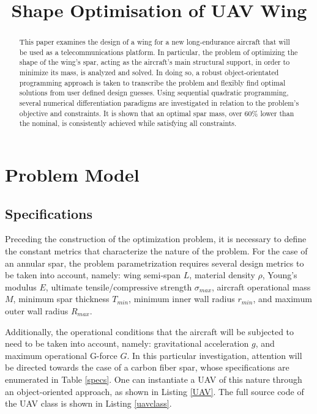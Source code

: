 \documentclass{article}
\title{Shape Optimisation of UAV Wing}
\begin{document}
\maketitle

\begin{abstract}
    This paper examines the design of a wing for a new long-endurance aircraft that will be used as a telecommunications platform. In particular, the problem of optimizing the shape of the wing's spar, acting as the aircraft's main structural support, in order to minimize its mass, is analyzed and solved. In doing so, a robust object-orientated programming approach is taken to transcribe the problem and flexibly find optimal solutions from user defined design guesses. Using sequential quadratic programming, several numerical differentiation paradigms are investigated in relation to the problem's objective and constraints. It is shown that an optimal spar mass, over 60\% lower than the nominal, is consistently achieved while satisfying all constraints.
\end{abstract}
    

\tableofcontents
\listoftables
\listoffigures
\lstlistoflistings

\section{Problem Model}
\subsection{Specifications}
Preceding the construction of the optimization problem, it is necessary to define the constant metrics that characterize the nature of the problem. For the case of an annular spar, the problem parametrization requires several design metrics to be taken into account, namely: wing semi-span $L$, material density $\rho$, Young's modulus $E$, ultimate tensile/compressive strength $\sigma_{max}$, aircraft operational mass $M$, minimum spar thickness $T_{min}$, minimum inner wall radius $r_{min}$, and maximum outer wall radius $R_{max}$. 

Additionally, the operational conditions that the aircraft will be subjected to need to be taken into account, namely: gravitational acceleration $g$, and maximum operational G-force $G$. In this particular investigation, attention will be directed towards the case of a carbon fiber spar, whose specifications are enumerated in Table \ref{specs}. One can instantiate a UAV of this nature through an object-oriented approach, as shown in Listing \ref{UAV}. The full source code of the UAV class is shown in Listing \ref{uavclass}.
\end{document}
